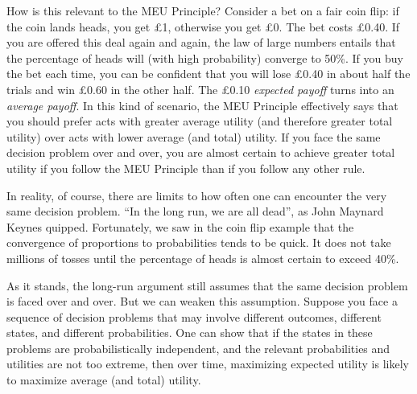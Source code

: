 How is this relevant to the MEU Principle? Consider a bet on a fair coin flip:
if the coin lands heads, you get £1, otherwise you get £0. The bet costs £0.40.
If you are offered this deal again and again, the law of large numbers entails
that the percentage of heads will (with high probability) converge to 50\%. If
you buy the bet each time, you can be confident that you will lose £0.40 in
about half the trials and win £0.60 in the other half. The £0.10 \emph{expected
  payoff} turns into an \emph{average payoff}. In this kind of scenario, the MEU
Principle effectively says that you should prefer acts with greater average
utility (and therefore greater total utility) over acts with lower average (and
total) utility. If you face the same decision problem over and over,  you
are almost certain to achieve greater total utility if you follow the MEU
Principle than if you follow any other rule.

In reality, of course, there are limits to how often one can encounter the very
same decision problem. ``In the long run, we are all dead'', as John Maynard
Keynes quipped. Fortunately, we saw in the coin flip example that the
convergence of proportions to probabilities tends to be quick. It does not take
millions of tosses until the percentage of heads is almost certain to exceed
40\%.

As it stands, the long-run argument still assumes that the same decision problem
is faced over and over. But we can weaken this assumption. Suppose you face a
sequence of decision problems that may involve different outcomes, different
states, and different probabilities. One can show that if the states in these
problems are probabilistically independent, and the relevant probabilities and
utilities are not too extreme, then over time, maximizing expected utility is
likely to maximize average (and total) utility.


